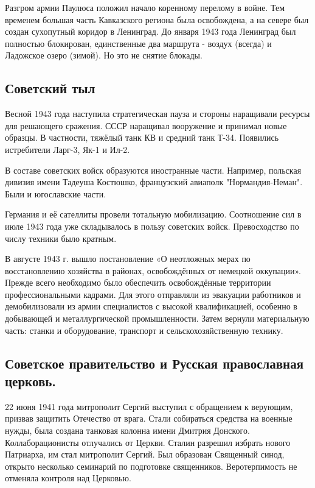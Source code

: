 Разгром армии Паулюса положил начало коренному перелому в войне. Тем временем большая часть Кавказского региона была освобождена, а на севере был создан сухопутный коридор в Ленинград. До января 1943 года Ленинград был полностью блокирован, единственные два маршрута - воздух (всегда) и Ладожское озеро (зимой). Но это не снятие блокады.

\subsection{Советский тыл}

Весной 1943 года наступила стратегическая пауза и стороны наращивали ресурсы для решающего сражения. СССР наращивал вооружение и принимал новые образцы. В частности, тяжёлый танк КВ и средний танк Т-34. Появились истребители Ларг-3, Як-1 и Ил-2.

В составе советских войск образуются иностранные части. Например, польская дивизия имени Тадеуша Костюшко, французский авиаполк "Нормандия-Неман". Были и югославские части.

Германия и её сателлиты провели тотальную мобилизацию. Соотношение сил в июле 1943 года уже складывалось в пользу советских войск. Превосходство по числу техники было кратным.

В августе 1943 г. вышло постановление «О неотложных мерах по восстановлению хозяйства в районах, освобождённых от немецкой оккупации». Прежде всего необходимо было обеспечить освобождённые территории профессиональными кадрами. Для этого отправляли из эвакуации работников и демобилизовали из армии специалистов с высокой квалификацией, особенно в добывающей и металлургической промышленности. Затем вернули материальную часть: станки и оборудование, транспорт и сельскохозяйственную технику. 

\subsection{Советское правительство и Русская православная церковь.}

22 июня 1941 года митрополит Сергий выступил с обращением к верующим, призвав защитить Отечество от врага. Стали собираться средства на военные нужды, была создана танковая колонна имени Дмитрия Донского. Коллаборационисты отлучались от Церкви. Сталин разрешил избрать нового Патриарха, им стал митрополит Сергий. Был образован Священный синод, открыто несколько семинарий по подготовке священников. Веротерпимость не отменяла контроля над Церковью.

